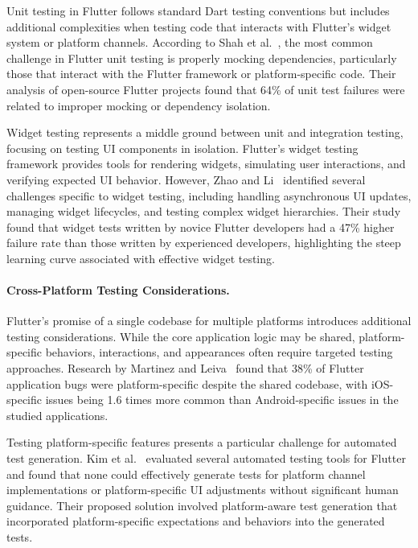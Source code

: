 \hspace{0.5cm} Unit testing in Flutter follows standard Dart testing conventions but includes additional complexities when testing code that interacts with Flutter's widget system or platform channels. According to Shah et al.~\cite{FlutterUnitTesting}, the most common challenge in Flutter unit testing is properly mocking dependencies, particularly those that interact with the Flutter framework or platform-specific code. Their analysis of open-source Flutter projects found that 64\% of unit test failures were related to improper mocking or dependency isolation.

\hspace{0.5cm} Widget testing represents a middle ground between unit and integration testing, focusing on testing UI components in isolation. Flutter's widget testing framework provides tools for rendering widgets, simulating user interactions, and verifying expected UI behavior. However, Zhao and Li~\cite{WidgetTestChallenges} identified several challenges specific to widget testing, including handling asynchronous UI updates, managing widget lifecycles, and testing complex widget hierarchies. Their study found that widget tests written by novice Flutter developers had a 47\% higher failure rate than those written by experienced developers, highlighting the steep learning curve associated with effective widget testing.

\paragraph{Cross-Platform Testing Considerations.} Flutter's promise of a single codebase for multiple platforms introduces additional testing considerations. While the core application logic may be shared, platform-specific behaviors, interactions, and appearances often require targeted testing approaches. Research by Martinez and Leiva~\cite{CrossPlatformTesting} found that 38\% of Flutter application bugs were platform-specific despite the shared codebase, with iOS-specific issues being 1.6 times more common than Android-specific issues in the studied applications.

\hspace{0.5cm} Testing platform-specific features presents a particular challenge for automated test generation. Kim et al.~\cite{PlatformSpecificTesting} evaluated several automated testing tools for Flutter and found that none could effectively generate tests for platform channel implementations or platform-specific UI adjustments without significant human guidance. Their proposed solution involved platform-aware test generation that incorporated platform-specific expectations and behaviors into the generated tests.

